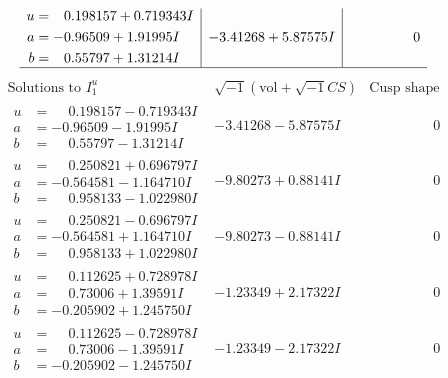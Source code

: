 \documentclass[1p]{elsarticle_modified}
\theoremstyle{definition}
\newcommand{\I}{\sqrt{-1}}
\begin{document}
$$\begin{array}{c|c|c}
\begin{aligned}
u &= \phantom{-}0.198157 + 0.719343 I \\
a &= -0.96509 + 1.91995 I \\
b &= \phantom{-}0.55797 + 1.31214 I\end{aligned}
 & -3.41268 + 5.87575 I & \phantom{-0.000000 } 0\\
 \hline 
 \end{array}$$\newpage$$\begin{array}{c|c|c}  
\text{Solutions to }I^u_{1}& \I (\text{vol} + \sqrt{-1}CS) & \text{Cusp shape}\\
 \hline 
\begin{aligned}
u &= \phantom{-}0.198157 - 0.719343 I \\
a &= -0.96509 - 1.91995 I \\
b &= \phantom{-}0.55797 - 1.31214 I\end{aligned}
 & -3.41268 - 5.87575 I & \phantom{-0.000000 } 0 \\ \hline\begin{aligned}
u &= \phantom{-}0.250821 + 0.696797 I \\
a &= -0.564581 - 1.164710 I \\
b &= \phantom{-}0.958133 - 1.022980 I\end{aligned}
 & -9.80273 + 0.88141 I & \phantom{-0.000000 } 0 \\ \hline\begin{aligned}
u &= \phantom{-}0.250821 - 0.696797 I \\
a &= -0.564581 + 1.164710 I \\
b &= \phantom{-}0.958133 + 1.022980 I\end{aligned}
 & -9.80273 - 0.88141 I & \phantom{-0.000000 } 0 \\ \hline\begin{aligned}
u &= \phantom{-}0.112625 + 0.728978 I \\
a &= \phantom{-}0.73006 + 1.39591 I \\
b &= -0.205902 + 1.245750 I\end{aligned}
 & -1.23349 + 2.17322 I & \phantom{-0.000000 } 0 \\ \hline\begin{aligned}
u &= \phantom{-}0.112625 - 0.728978 I \\
a &= \phantom{-}0.73006 - 1.39591 I \\
b &= -0.205902 - 1.245750 I\end{aligned}
 & -1.23349 - 2.17322 I & \phantom{-0.000000 } 0 \\ \hline\begin{aligned}

\end{aligned}
\end{array}$$
\end{document}
